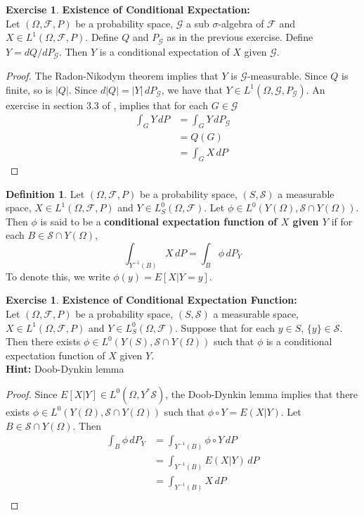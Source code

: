 \documentclass[12pt]{amsart}
\theoremstyle{definition}
\newtheorem{defn}[definition]{Definition}
\newtheorem{ex}[definition]{Exercise}
\newcommand{\sig}{\sigma}
\newcommand{\Om}{\Omega}
\newcommand{\MF}{\mathcal{F}}
\newcommand{\MG}{\mathcal{G}}
\newcommand{\MS}{\mathcal{S}}
\newcommand{\dP}{\, d P}
\begin{document}
	\begin{ex}\textbf{Existence of Conditional Expectation:}\\
	Let $(\Om, \MF, P)$ be a probability space, $\MG$ a sub $\sig$-algebra of $\MF$ and $X \in L^1(\Om, \MF, P)$. Define $Q$ and $P_{\MG}$ as in the previous exercise. Define $Y = dQ/dP_{\MG}$. Then $Y$ is a conditional expectation of $X$ given $\MG$.
	\end{ex}
	
	\begin{proof}
		The Radon-Nikodym theorem implies that $Y$ is $\MG$-measurable. Since $Q$ is finite, so is $|Q|$. Since $d|Q| = |Y|\dP_{\MG}$, we have that $Y \in L^1(\Om, \MG, P_{\MG})$. An exercise in section $3.3$ of \cite{measure}, implies that for each $G \in \MG$ 
		\begin{align*}
		\int_G Y \dP 
		&= \int_G Y \dP_{\MG} \\
		&= Q(G) \\
		&= \int_G X \dP
\end{align*}					
	\end{proof}	
	
	\begin{defn}
	Let $(\Om, \MF, P)$ be a probability space, $(S, \MS)$ a measurable space, $X \in L^1(\Om, \MF, P)$ and $Y \in L^0_S(\Om, \MF)$. Let $\phi \in L^0(Y(\Om), \MS \cap Y(\Om))$. Then $\phi$ is said to be a \textbf{conditional expectation function of $X$ given $Y$} if for each $B \in \MS \cap Y(\Om)$, $$\int_{Y^{-1}(B)} X \dP = \int_{B} \phi \dP_Y$$
	To denote this, we write $\phi(y) = E[X|Y = y]$.
	\end{defn}
	
	
	
	\begin{ex} \textbf{Existence of Conditional Expectation Function:} \\
	Let $(\Om, \MF, P)$ be a probability space, $(S, \MS)$ a measurable space, $X \in L^1(\Om, \MF, P)$ and $Y \in L^0_S(\Om, \MF)$. Suppose that for each $y \in S$, $\{y\} \in \MS$. Then there exists $\phi \in L^0(Y(S), \MS \cap Y(\Om))$ such that $\phi$ is a conditional expectation function of $X$ given $Y$.\\
	\textbf{Hint:} Doob-Dynkin lemma
	\end{ex}	
	
	\begin{proof}
	Since $E[X| Y] \in L^0(\Om, Y^*\MS)$, the Doob-Dynkin lemma implies that there exists $\phi \in L^0(Y(\Om), \MS \cap Y(\Om))$ such that $\phi \circ Y = E(X|Y)$. Let $B \in \MS \cap Y(\Om)$. Then 
	\begin{align*}
	\int_B \phi \dP_Y
	&= \int_{Y^{-1}(B)} \phi \circ Y \dP \\
	&= \int_{Y^{-1}(B)} E(X|Y) \dP \\
	&= \int_{Y^{-1}(B)} X \dP \\
	\end{align*}
	\end{proof}
	
\end{document}
